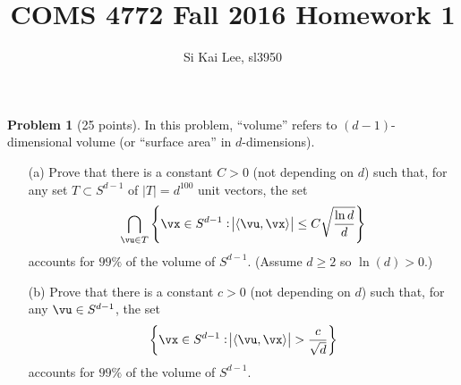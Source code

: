 \documentclass[11pt]{article}
\title{COMS 4772 Fall 2016 Homework 1}
\author{Si Kai Lee, sl3950}
\date{}
\newcommand\ip[1]{\langle #1 \rangle} %
\newcommand{\unitsphere}[1][d-1]{\ensuremath{S^{#1}}} %
\theoremstyle{definition}
\newtheorem{problem}{Problem}
\begin{document}
\maketitle

\begin{problem}[25 points]
  In this problem, ``volume'' refers to $(d-1)$-dimensional volume (or ``surface area'' in $d$-dimensions).
  \begin{enumerate}
    \item[(a)]
      Prove that there is a constant $C>0$ (not depending on $d$) such that, for any set $T \subset \unitsphere$ of $|T|=d^{100}$ unit vectors, the set
      \begin{equation*}
        \bigcap_{\vu \in T}
        \cbr{
          \vx \in \unitsphere : \abs{\ip{\vu,\vx}} \leq C\sqrt{\frac{\ln d}{d}}
        }
      \end{equation*}
      accounts for $99\%$ of the volume of $\unitsphere$.
      (Assume $d\geq2$ so $\ln(d) > 0$.)

    \item[(b)]
      Prove that there is a constant $c>0$ (not depending on $d$) such that, for any $\vu \in \unitsphere$, the set
      \begin{equation*}
        \cbr{
          \vx \in \unitsphere : \abs{\ip{\vu,\vx}} > \frac{c}{\sqrt{d}}
        }
      \end{equation*}
      accounts for $99\%$ of the volume of $\unitsphere$.

  \end{enumerate}
\end{problem}
\end{document}
